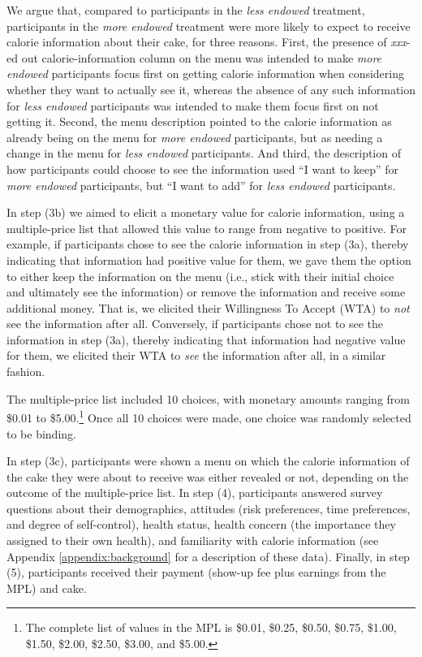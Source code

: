 We argue that, compared to participants in the \emph{less endowed} treatment, participants in the \emph{more endowed} treatment were more likely to expect to receive calorie information about their cake, for three reasons. First, the presence of \emph{xxx}-ed out calorie-information column on the menu was intended to make \emph{more endowed} participants focus first on getting calorie information when considering whether they want to actually see it, whereas the absence of any such information for \emph{less endowed} participants was intended to make them focus first on not getting it. Second, the menu description pointed to the calorie information as already being on the menu for \emph{more endowed} participants, but as needing a change in the menu for \emph{less endowed} participants. And third, the description of how participants could choose to see the information used \enquote{I want to keep} for \emph{more endowed} participants, but \enquote{I want to add} for \emph{less endowed} participants.


In step (3b) we aimed to elicit a monetary value for calorie information, using a multiple-price list that allowed this value to range from negative to positive. For example, if participants chose to see the calorie information in step (3a), thereby indicating that information had positive value for them, we gave them the option to either keep the information on the menu (i.e., stick with their initial choice and ultimately see the information) or remove the information and receive some additional money. That is, we elicited their Willingness To Accept (WTA) to \emph{not} see the information after all. Conversely, if participants chose not to see the information in step (3a), thereby indicating that information had negative value for them, we elicited their WTA to \emph{see} the information after all, in a similar fashion.

The multiple-price list included 10 choices, with monetary amounts ranging from \$0.01 to \$5.00.\footnote{The complete list of values in the MPL is \$0.01, \$0.25, \$0.50, \$0.75, \$1.00, \$1.50, \$2.00, \$2.50, \$3.00, and \$5.00.}  Once all 10 choices were made, one choice was randomly selected to be binding.

In step (3c), participants were shown a menu on which the calorie information of the cake they were about to receive was either revealed or not, depending on the outcome of the multiple-price list. In step (4), participants answered survey questions about their demographics, attitudes (risk preferences, time preferences, and degree of self-control), health status, health concern (the importance they assigned to their own health), and familiarity with calorie information (see Appendix \ref{appendix:background} for a description of these data). Finally, in step (5), participants received their payment (show-up fee plus earnings from the MPL) and cake.

